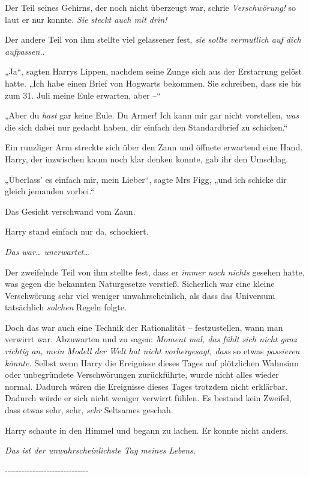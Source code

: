 {Der Teil seines Gehirns, der noch nicht überzeugt war, schrie \emph{Verschwörung!} so laut er nur konnte. \emph{Sie steckt auch mit drin!}

Der andere Teil von ihm stellte viel gelassener fest, \emph{sie sollte vermutlich auf dich aufpassen.}.

„Ja“, sagten Harrys Lippen, nachdem seine Zunge sich aus der Erstarrung gelöst hatte. „Ich habe einen Brief von Hogwarts bekommen. Sie schreiben, dass sie bis zum 31. Juli meine Eule erwarten, aber --“

„Aber du \emph{hast} gar keine Eule. Du Armer! Ich kann mir gar nicht vorstellen, \emph{was} die sich dabei nur gedacht haben, dir einfach den Standardbrief zu schicken.“

Ein runzliger Arm streckte sich über den Zaun und öffnete erwartend eine Hand. Harry, der inzwischen kaum noch klar denken konnte, gab ihr den Umschlag.

„Überlass' es einfach mir, mein Lieber“, sagte Mrs Figg, „und ich schicke dir gleich jemanden vorbei.“

Das Gesicht verschwand vom Zaun.

Harry stand einfach nur da, schockiert.

\emph{Das war… unerwartet…}

Der zweifelnde Teil von ihm stellte fest, dass er \emph{immer noch nichts} gesehen hatte, was gegen die bekannten Naturgesetze verstieß. Sicherlich war eine kleine Verschwörung sehr viel weniger unwahrscheinlich, als dass das Universum tatsächlich \emph{solchen} Regeln folgte.

Doch das war auch eine Technik der Rationalität -- festzustellen, wann man verwirrt war. Abzuwarten und zu sagen: \emph{Moment mal, das fühlt sich nicht ganz richtig an, mein Modell der Welt hat nicht vorhergesagt, dass} so etwas \emph{passieren könnte.} Selbst wenn Harry die Ereignisse dieses Tages auf plötzlichen Wahnsinn oder unbegründete Verschwörungen zurückführte, wurde nicht alles wieder normal. Dadurch wären die Ereignisse dieses Tages trotzdem nicht erklärbar. Dadurch würde er sich nicht weniger verwirrt fühlen. Es bestand kein Zweifel, dass etwas sehr, sehr, \emph{sehr} Seltsames geschah.

Harry schaute in den Himmel und begann zu lachen. Er konnte nicht anders.

\emph{Das ist der unwahrscheinlichste Tag meines Lebens.}

-\/-\/-\/-\/-\/-\/-\/-\/-\/-\/-\/-\/-\/-\/-\/-\/-\/-\/-\/-\/-\/-\/-\/-\/-\/-\/-\/-\/-\/-

}
